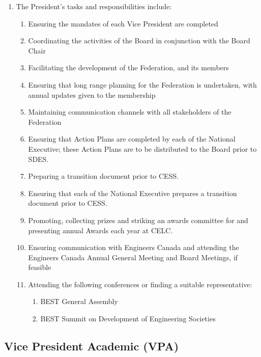 \begin{enumerate}
 \item
  The President's tasks and responsibilities include:
  \begin{enumerate}
   \item
    Ensuring the mandates of each Vice President are completed
   \item
    Coordinating the activities of the Board in conjunction with the Board Chair
   \item
    Facilitating the development of the Federation, and its members
   \item
    Ensuring that long range planning for the Federation is undertaken, with annual updates given to the membership
   \item
    Maintaining communication channels with all stakeholders of the Federation
   \item
    Ensuring that Action Plans are completed by each of the National Executive; these Action Plans are to be distributed to the Board prior to SDES.
   \item
    Preparing a transition document prior to CESS.
   \item
    Ensuring that each of the National Executive prepares a transition document prior to CESS.
   \item
    Promoting, collecting prizes and striking an awards committee for and presenting annual Awards each year at CELC.
   \item
    Ensuring communication with Engineers Canada and attending the Engineers Canada Annual General Meeting and Board Meetings, if feasible
   \item
    Attending the following conferences or finding a suitable representative:

    \begin{enumerate}
     \item
      BEST General Assembly
     \item
      BEST Summit on Development of Engineering Societies
    \end{enumerate}
  \end{enumerate}
\end{enumerate}

\subsection{Vice President Academic (VPA)}
\label{vice-president-academic-vpa}


